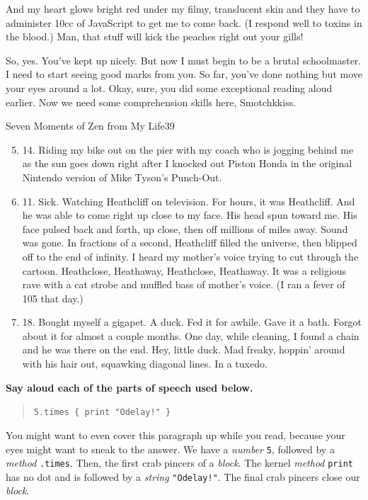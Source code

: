 \documentclass[10pt,twoside]{report}
\begin{document}
And my heart glows bright red under my filmy, translucent skin and
they have to administer 10cc of JavaScript to get me to come back.  (I
respond well to toxins in the blood.)  Man, that stuff will kick the
peaches right out your gills!

So, yes.  You've kept up nicely.  But now I must begin to be a brutal
schoolmaster. I need to start seeing good marks from you.  So far,
you've done nothing but move your eyes around a lot.  Okay, sure, you
did some exceptional reading aloud earlier.  Now we need some
comprehension skills here, Smotchkkiss.

	\begin{sidebar}{Seven Moments of Zen from My Life}{39}
		\begin{enumerate}
			\setcounter{enumi}{4}
			\item 14. Riding my bike out on the pier with my coach who is jogging behind me as the sun goes down right after I knocked out Piston Honda in the original Nintendo version of Mike Tyson's Punch-Out.
			\item 11. Sick. Watching Heathcliff on television. For hours, it was Heathcliff. And he was able to come right up close to my face. His head spun toward me. His face pulsed back and forth, up close, then off millions of miles away. Sound was gone. In fractions of a second, Heathcliff filled the universe, then blipped off to the end of infinity. I heard my mother's voice trying to cut through the cartoon. Heathclose, Heathaway, Heathclose, Heathaway. It was a religious rave with a cat strobe and muffled bass of mother's voice. (I ran a fever of 105 that day.)
			\item 18. Bought myself a gigapet. A duck. Fed it for awhile. Gave it a bath. Forgot about it for almost a couple months. One day, while cleaning, I found a chain and he was there on the end. Hey, little duck. Mad freaky, hoppin' around with his hair out, squawking diagonal lines. In a tuxedo.
		\end{enumerate}
	\end{sidebar}

{\bf Say aloud each of the parts of speech used below.}

\begin{quote}
\lstinline[breaklines=true]|5.times { print "Odelay!" }|\end{quote}


You might want to even cover this paragraph up while you read, because
your eyes might want to sneak to the answer.  We have a {\em number}
\lstinline[breaklines=true]|5|, followed by a {\em method}
\lstinline[breaklines=true]|.times|.  Then, the first crab pincers of
a {\em block}.  The kernel {\em method}
\lstinline[breaklines=true]|print| has no dot and is followed by a
          {\em string} \lstinline[breaklines=true]|"Odelay!"|.  The
          final crab pincers close our {\em block}.
\end{document}
